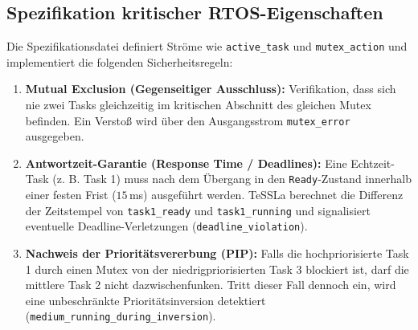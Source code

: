 \subsection{Spezifikation kritischer RTOS-Eigenschaften}
Die Spezifikationsdatei definiert Ströme wie \lstinline|active_task| und \lstinline|mutex_action| und implementiert die folgenden Sicherheitsregeln:

\begin{enumerate}
    \item \textbf{Mutual Exclusion (Gegenseitiger Ausschluss):} Verifikation, dass sich nie zwei Tasks gleichzeitig im kritischen Abschnitt des gleichen Mutex befinden. Ein Verstoß wird über den Ausgangsstrom \lstinline|mutex_error| ausgegeben.
    \item \textbf{Antwortzeit-Garantie (Response Time / Deadlines):} Eine Echtzeit-Task (z. B. Task 1) muss nach dem Übergang in den \lstinline|Ready|-Zustand innerhalb einer festen Frist ($15$\,ms) ausgeführt werden. TeSSLa berechnet die Differenz der Zeitstempel von \lstinline|task1_ready| und \lstinline|task1_running| und signalisiert eventuelle Deadline-Verletzungen (\lstinline|deadline_violation|).
    \item \textbf{Nachweis der Prioritätsvererbung (PIP):} Falls die hochpriorisierte Task 1 durch einen Mutex von der niedrigpriorisierten Task 3 blockiert ist, darf die mittlere Task 2 nicht dazwischenfunken. Tritt dieser Fall dennoch ein, wird eine unbeschränkte Prioritätsinversion detektiert (\lstinline|medium_running_during_inversion|).
\end{enumerate}

